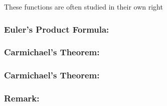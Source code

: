 These functions are often studied in their own right

\subsubsection{Euler's Product Formula:}
\subsubsection{Carmichael's Theorem:}
\subsubsection{Carmichael's Theorem:}
\subsubsection{Remark:}
